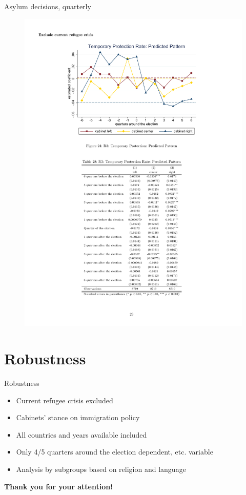 \documentclass{beamer}
\begin{document}
\begin{frame}{Asylum decisions, quarterly}
\begin{figure}[tb]
\begin{center}
  \includegraphics[width=12cm]{graph3.pdf}
 \end{center}
\end{figure}
\end{frame}


\section{Robustness}
	\begin{frame}{Robustness}
\begin{itemize}
\item Current refugee crisis excluded
\item Cabinets' stance on immigration policy  
\item All countries and years available included 
\item Only 4/5 quarters around the election dependent, etc. variable
\item Analysis by subgroups based on religion and language
\end{itemize}
	\end{frame}


	\begin{frame}
\Large
\begin{center}
\textbf{{Thank you for your attention!}}
\end{center}
\normalsize
	\end{frame}
\end{document}

